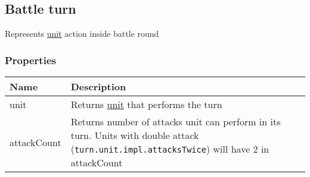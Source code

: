 \subsection{Battle turn}
\label{BattleTurn}
Represents \hyperref[Unit]{unit} action inside battle round\\
\subsubsection{Properties}
\begin{center}
\begin{tabularx}{\linewidth}{| l | X |}
\hline
\textbf{Name} & \textbf{Description} \\
\hline
unit & Returns \hyperref[Unit]{unit} that performs the turn\\
\hline
attackCount & Returns number of attacks unit can perform in its turn. Units with double attack (\texttt{turn.unit.impl.attacksTwice}) will have 2 in attackCount\\
\hline
\end{tabularx}
\end{center}